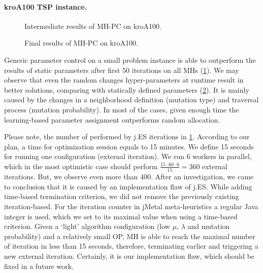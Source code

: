 \paragraph{kroA100 TSP instance.}
\begin{figure}[t]
	\centering
	\vspace{-20pt}
	
	\caption{Intermediate results of MH-PC on kroA100.}
	\vspace{-5pt}
	\label{eval:pict:pc:kroA100 intermediate}
\end{figure}
\begin{figure}[b]
	\centering
	\vspace{-20pt}
	
	\caption{Final results of MH-PC on kroA100.}
	\vspace{-5pt}
	\label{eval:pict:pc:kroA100 final}
\end{figure}

Generic parameter control on a small problem instance is able to outperform the results of static parameters after first 50 iterations on all MHs (\cref{eval:pict:pc:kroA100 intermediate}). We may observe that even the random changes hyper-parameters at runtime result in better solutions, comparing with statically defined parameters (\cref{eval:pict:pc:kroA100 final}). It is mainly caused by the changes in a neighborhood definition (mutation type) and traversal process (mutation probability). In most of the cases, given enough time the learning-based parameter assignment outperforms random allocation.

Please note, the number of performed by j.ES iterations in \cref{eval:pict:pc:kroA100 intermediate}. According to our plan, a time for optimization session equals to 15 minutes. We define 15 seconds for running one configuration (external iteration). We run 6 workers in parallel, which in the most optimistic case should perform $\frac{15\cdot60\cdot6}{15} = 360$ external iterations. But, we observe even more than 400. After an investigation, we came to conclusion that it is caused by an implementation flaw of j.ES. While adding time-based termination criterion, we did not remove the previously existing iteration-based. For the iteration counter in jMetal meta-heuristics a regular Java integer is used, which we set to its maximal value when using a time-based criterion. Given a `light' algorithm configuration (low $\mu$, $\lambda$ and mutation probability) and a relatively small OP, MH is able to reach the maximal number of iteration in less than 15 seconds, therefore, terminating earlier and triggering a new external iteration. Certainly, it is our implementation flaw, which should be fixed in a future work.

